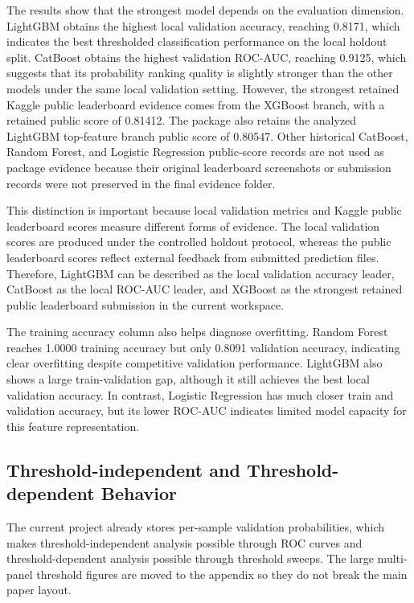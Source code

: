 \documentclass[conference]{IEEEtran}
\begin{document}
The results show that the strongest model depends on the evaluation dimension. LightGBM obtains the
highest local validation accuracy, reaching 0.8171, which indicates the best thresholded classification
performance on the local holdout split. CatBoost obtains the highest validation ROC-AUC, reaching 0.9125,
which suggests that its probability ranking quality is slightly stronger than the other models under the
same local validation setting. However, the strongest retained Kaggle public leaderboard evidence comes from the
XGBoost branch, with a retained public score of 0.81412. The package also retains the analyzed LightGBM
top-feature branch public score of 0.80547. Other historical CatBoost, Random Forest, and Logistic Regression
public-score records are not used as package evidence because their original leaderboard screenshots or
submission records were not preserved in the final evidence folder.

This distinction is important because local validation metrics and Kaggle public leaderboard scores measure
different forms of evidence. The local validation scores are produced under the controlled holdout protocol,
whereas the public leaderboard scores reflect external feedback from submitted prediction files. Therefore,
LightGBM can be described as the local validation accuracy leader, CatBoost as the local ROC-AUC leader, and
XGBoost as the strongest retained public leaderboard submission in the current workspace.

The training accuracy column also helps diagnose overfitting. Random Forest reaches 1.0000 training accuracy
but only 0.8091 validation accuracy, indicating clear overfitting despite competitive validation performance.
LightGBM also shows a large train-validation gap, although it still achieves the best local validation
accuracy. In contrast, Logistic Regression has much closer train and validation accuracy, but its lower ROC-AUC
indicates limited model capacity for this feature representation.

\subsection{Threshold-independent and Threshold-dependent Behavior}
The current project already stores per-sample validation probabilities, which makes threshold-independent analysis possible through ROC curves and threshold-dependent analysis possible through threshold sweeps. The large multi-panel threshold figures are moved to the appendix so they do not break the main paper layout.
\end{document}
